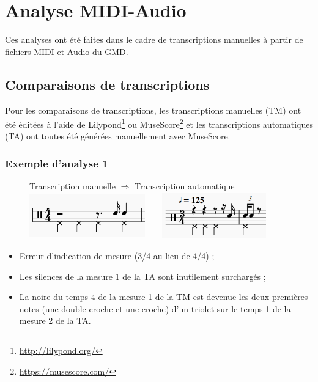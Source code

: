 \section{Analyse MIDI-Audio}
\label{analyse_midi_audio}
Ces analyses ont été faites dans le cadre de transcriptions manuelles à partir de fichiers MIDI et Audio du GMD.
\subsection*{Comparaisons de transcriptions}
Pour les comparaisons de transcriptions, les transcriptions manuelles (TM) ont été éditées à l’aide de Lilypond\footnote{\url{http://lilypond.org/}} ou MuseScore\footnote{\url{https://musescore.com/}} et les transcriptions automatiques (TA) ont toutes été générées manuellement avec MuseScore.
\subsubsection{Exemple d’analyse 1}
\begin{figure}[h]
	\centering
	Transcription manuelle $\Rightarrow$ Transcription automatique
	\includegraphics[height=20mm, width=50mm]{z_images/4_experimentations/1_analyse_midi_audio/0_drummer1_session3/1_manuelle.png}\ \ \ \ 
	\includegraphics[height=20mm, width=45mm]{z_images/4_experimentations/1_analyse_midi_audio/0_drummer1_session3/0_musescore.png}
\end{figure}
\begin{itemize}
	\item Erreur d’indication de mesure (3/4 au lieu de 4/4) ;
	\item Les silences de la mesure 1 de la TA sont inutilement surchargés ;
	\item La noire du temps 4 de la mesure 1 de la TM est devenue les deux premières notes (une double-croche et une croche) d’un triolet sur le temps 1 de la mesure 2 de la TA.
\end{itemize}\newpage
